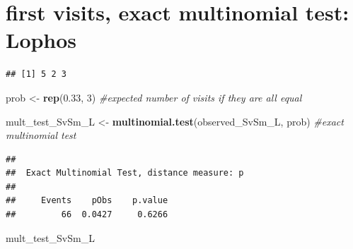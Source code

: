 \documentclass[]{article}
\newenvironment{Shaded}{\begin{snugshade}}{\end{snugshade}}
\newcommand{\KeywordTok}[1]{\textcolor[rgb]{0.13,0.29,0.53}{\textbf{{#1}}}}
\newcommand{\DecValTok}[1]{\textcolor[rgb]{0.00,0.00,0.81}{{#1}}}
\newcommand{\FloatTok}[1]{\textcolor[rgb]{0.00,0.00,0.81}{{#1}}}
\newcommand{\StringTok}[1]{\textcolor[rgb]{0.31,0.60,0.02}{{#1}}}
\newcommand{\CommentTok}[1]{\textcolor[rgb]{0.56,0.35,0.01}{\textit{{#1}}}}
\newcommand{\NormalTok}[1]{{#1}}
\begin{document}
\section{first visits, exact multinomial test:
Lophos}\label{first-visits-exact-multinomial-test-lophos-2}

\begin{Shaded}
\end{Shaded}

\begin{verbatim}
## [1] 5 2 3
\end{verbatim}

\begin{Shaded}
\begin{Highlighting}[]
\NormalTok{prob <-}\StringTok{ }\KeywordTok{rep}\NormalTok{(}\FloatTok{0.33}\NormalTok{, }\DecValTok{3}\NormalTok{) }\CommentTok{#expected number of visits if they are all equal}
 
\NormalTok{mult_test_SvSm_L <-}\StringTok{ }\KeywordTok{multinomial.test}\NormalTok{(observed_SvSm_L, prob) }\CommentTok{#exact multinomial test}
\end{Highlighting}
\end{Shaded}

\begin{verbatim}
## 
##  Exact Multinomial Test, distance measure: p
## 
##     Events    pObs    p.value
##         66  0.0427     0.6266
\end{verbatim}

\begin{Shaded}
\begin{Highlighting}[]
\NormalTok{mult_test_SvSm_L}
\end{Highlighting}
\end{Shaded}
\end{document}
